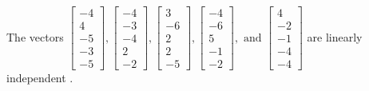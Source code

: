 \begin{exercise}
\begin{exerciseStatement}
  \end{exerciseStatement}
  \begin{exerciseAnswer}
   The vectors \(\left[\begin{array}{r}
-4 \\
4 \\
-5 \\
-3 \\
-5
\end{array}\right] , \left[\begin{array}{r}
-4 \\
-3 \\
-4 \\
2 \\
-2
\end{array}\right] , \left[\begin{array}{r}
3 \\
-6 \\
2 \\
2 \\
-5
\end{array}\right] , \left[\begin{array}{r}
-4 \\
-6 \\
5 \\
-1 \\
-2
\end{array}\right] , \text{ and } \left[\begin{array}{r}
4 \\
-2 \\
-1 \\
-4 \\
-4
\end{array}\right]\) are 
  	 linearly independent  .
  


  \end{exerciseAnswer}
\end{exercise}